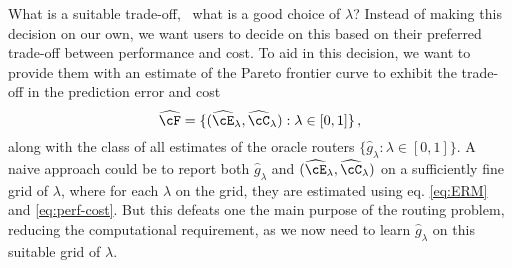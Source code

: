 


\noindent What is a suitable trade-off, \ie\ what is a good choice of $\lambda$? Instead of making this decision on our own, we want users to decide on this based on their preferred trade-off between performance and cost. To aid in this decision, we want to provide them with an estimate of the Pareto frontier curve to exhibit the trade-off in the prediction error and cost
\begin{equation}
    \textstyle \widehat \cF = \{(\widehat \cE _\lambda, \widehat \cC_\lambda ): \lambda \in [0, 1]\}\,, 
\end{equation} along with the class of all estimates of the oracle routers $\{\widehat g_\lambda: \lambda \in [0, 1]\}$. A naive approach could be to report both $\widehat g_\lambda$ and $(\widehat \cE _\lambda, \widehat \cC_\lambda )$ on a sufficiently fine grid of $\lambda$, where for each $\lambda$ on the grid, they are estimated using eq. \eqref{eq:ERM} and \eqref{eq:perf-cost}. But this defeats one the main purpose of the routing problem, reducing the computational requirement, as we now need to learn $\widehat g_\lambda$ on this suitable grid of $\lambda$. 


